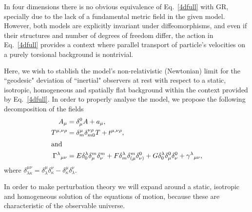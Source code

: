 \documentclass[twocolumn,aps,
  showpacs,showkeys,prd,superscriptaddress]{revtex4-1}
\renewcommand{\(}{\left(}
\renewcommand{\)}{\right)}
\renewcommand{\[}{\left[}
\renewcommand{\]}{\right]}
\begin{document}
In four dimensions there is no obvious equivalence of Eq.~\eqref{4dfull} with GR, specially due to the lack of a fundamental metric field in the given model. However, both models are explicitly invariant under diffeomorphisms, and even if their structures and number of degrees of freedom differ, the action in Eq.~\eqref{4dfull} provides a context where parallel transport of particle's velocities on a purely torsional background is nontrivial.

Here, we wish to stablish the model's non-relativistic (Newtonian) limit for the ``geodesic" deviation of ``inertial" observers at rest with respect to a static, isotropic, homogeneous and spatially flat background within the context provided by Eq.~\eqref{4dfull}. In order to properly analyse the model, we  propose the following decomposition of the fields
\begin{align}
  A_\mu &= \delta_\mu^0 A + a_\mu,\\
  T^{\mu,\nu\rho} &= \delta^{\mu}_m\delta^{\nu\rho}_{m0}T + t^{\mu,\nu\rho},\\
  \shortintertext{and}
  \Gamma^\lambda{}_{\mu\nu} &= E \delta^\lambda_0 \delta^m_\mu \delta^m_\nu + F \delta^\lambda_m \delta^m_{(\mu}\delta^0_{\nu)} + G\delta^\lambda_0 \delta^0_{\mu}\delta^0_{\nu} + \gamma^\lambda{}_{\mu\nu},
  \label{GammaExp}
\end{align}
where $\delta^{\mu\nu}_{\lambda\kappa}=\delta^{\mu}_{\lambda}\delta^{\nu}_{\kappa}-\delta^{\mu}_{\kappa}\delta^{\nu}_{\lambda}$.


In order to make perturbation theory we will expand around a static, isotropic and homogeneous solution of the equations of motion, because these are characteristic of the observable universe.
\end{document}
